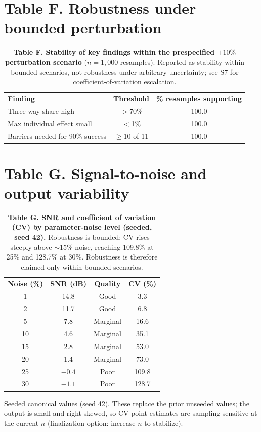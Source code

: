 \documentclass[10pt,letterpaper]{article}
\newlength\savedwidth
\newcommand\thickhline{\noalign{\global\savedwidth\arrayrulewidth\global\arrayrulewidth 2pt}\hline\noalign{\global\arrayrulewidth\savedwidth}}
\begin{document}
\section*{Table F. Robustness under bounded perturbation}
\begin{table}[!ht]\centering
\caption{{\bf Table F. Stability of key findings within the prespecified $\pm10\%$ perturbation scenario} ($n=1{,}000$ resamples). Reported as stability within bounded scenarios, not robustness under arbitrary uncertainty; see S7 for coefficient-of-variation escalation.}
\label{S6}
\begin{tabular}{l c c}
\hline \textbf{Finding} & \textbf{Threshold} & \textbf{\% resamples supporting} \\ \thickhline
Three-way share high & $>$70\% & 100.0 \\
Max individual effect small & $<$1\% & 100.0 \\
Barriers needed for 90\% success & $\geq$10 of 11 & 100.0 \\ \hline
\end{tabular}
\end{table}

\section*{Table G. Signal-to-noise and output variability}
\begin{table}[!ht]\centering
\caption{{\bf Table G. SNR and coefficient of variation (CV) by parameter-noise level (seeded, seed 42).} Robustness is bounded: CV rises steeply above $\sim$15\% noise, reaching 109.8\% at 25\% and 128.7\% at 30\%. Robustness is therefore claimed only within bounded scenarios.}
\label{S7}
\begin{tabular}{c c c c}
\hline \textbf{Noise (\%)} & \textbf{SNR (dB)} & \textbf{Quality} & \textbf{CV (\%)} \\ \thickhline
1 & 14.8 & Good & 3.3 \\
2 & 11.7 & Good & 6.8 \\
5 & 7.8 & Marginal & 16.6 \\
10 & 4.6 & Marginal & 35.1 \\
15 & 2.8 & Marginal & 53.0 \\
20 & 1.4 & Marginal & 73.0 \\
25 & $-0.4$ & Poor & 109.8 \\
30 & $-1.1$ & Poor & 128.7 \\ \hline
\end{tabular}
\begin{flushleft}\footnotesize Seeded canonical values (seed 42). These replace the prior unseeded values; the output is small and right-skewed, so CV point estimates are sampling-sensitive at the current $n$ (finalization option: increase $n$ to stabilize).\end{flushleft}
\end{table}
\end{document}
